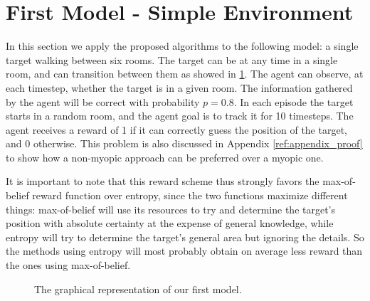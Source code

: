 \section{First Model - Simple Environment}

In this section we apply the proposed algorithms to the following model: a single target walking
between six rooms. The target can be at any time in a single room, and can transition between them
as showed in \ref{ref:nonmyo1}. The agent can observe, at each timestep, whether the target is in a
given room. The information gathered by the agent will be correct with probability $p=0.8$. In each
episode the target starts in a random room, and the agent goal is to track it for 10 timesteps. The
agent receives a reward of 1 if it can correctly guess the position of the target, and 0 otherwise.
This problem is also discussed in Appendix \ref{ref:appendix_proof} to show how a non-myopic
approach can be preferred over a myopic one.

It is important to note that this reward scheme thus strongly favors the max-of-belief reward
function over entropy, since the two functions maximize different things: max-of-belief will use its
resources to try and determine the target's position with absolute certainty at the expense of
general knowledge, while entropy will try to determine the target's general area but ignoring the
details. So the methods using entropy will most probably obtain on average less reward than the ones
using max-of-belief.


\begin{figure}[ht!]
\centering
{}
\caption{The graphical representation of our first model.}
\label{ref:nonmyo1}
\end{figure}

